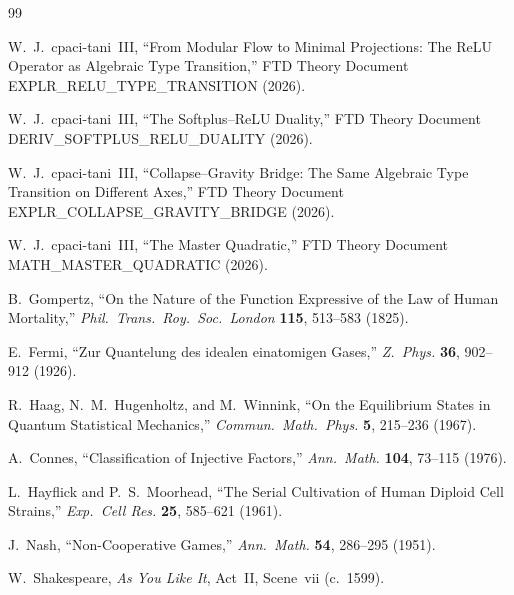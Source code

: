 \documentclass[12pt, letterpaper]{article}
\theoremstyle{plain}
\theoremstyle{definition}
\theoremstyle{remark}
\begin{document}
\begin{thebibliography}{99}

  W.~J.~cpaci-tani~III,
  ``From Modular Flow to Minimal Projections: The ReLU Operator as Algebraic Type Transition,''
  FTD Theory Document EXPLR\_RELU\_TYPE\_TRANSITION (2026).

  W.~J.~cpaci-tani~III,
  ``The Softplus--ReLU Duality,''
  FTD Theory Document DERIV\_SOFTPLUS\_RELU\_DUALITY (2026).

  W.~J.~cpaci-tani~III,
  ``Collapse--Gravity Bridge: The Same Algebraic Type Transition on Different Axes,''
  FTD Theory Document EXPLR\_COLLAPSE\_GRAVITY\_BRIDGE (2026).

  W.~J.~cpaci-tani~III,
  ``The Master Quadratic,''
  FTD Theory Document MATH\_MASTER\_QUADRATIC (2026).

  B.~Gompertz,
  ``On the Nature of the Function Expressive of the Law of Human Mortality,''
  \textit{Phil.\ Trans.\ Roy.\ Soc.\ London} \textbf{115}, 513--583 (1825).

  E.~Fermi,
  ``Zur Quantelung des idealen einatomigen Gases,''
  \textit{Z.\ Phys.} \textbf{36}, 902--912 (1926).

  R.~Haag, N.~M.~Hugenholtz, and M.~Winnink,
  ``On the Equilibrium States in Quantum Statistical Mechanics,''
  \textit{Commun.\ Math.\ Phys.} \textbf{5}, 215--236 (1967).

  A.~Connes,
  ``Classification of Injective Factors,''
  \textit{Ann.\ Math.} \textbf{104}, 73--115 (1976).

  L.~Hayflick and P.~S.~Moorhead,
  ``The Serial Cultivation of Human Diploid Cell Strains,''
  \textit{Exp.\ Cell Res.} \textbf{25}, 585--621 (1961).

  J.~Nash,
  ``Non-Cooperative Games,''
  \textit{Ann.\ Math.} \textbf{54}, 286--295 (1951).

  W.~Shakespeare,
  \textit{As You Like It}, Act~II, Scene~vii (c.~1599).

\end{thebibliography}
\end{document}
